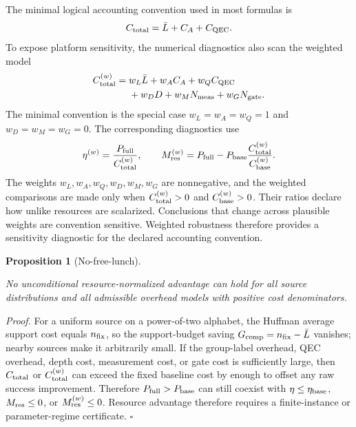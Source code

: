 \documentclass[
 reprint,
 amsmath,amssymb,
 aps,
 pra,
 floatfix,
]{revtex4-2}
\newtheorem{proposition}[theorem]{Proposition}
\begin{document}
The minimal logical accounting convention used in most formulas is
\begin{equation}
    C_{\rm total}=\bar L+C_A+C_{\rm QEC}.
\end{equation}
To expose platform sensitivity, the numerical diagnostics also scan the weighted model
\begin{equation}
    \begin{split}
    C_{\rm total}^{(w)}
    ={}& w_L\bar L+w_AC_A+w_QC_{\rm QEC}\\
    &+w_DD+w_MN_{\rm meas}+w_GN_{\rm gate}.
    \end{split}
    \label{eq:weighted_resource_model}
\end{equation}
The minimal convention is the special case \(w_L=w_A=w_Q=1\) and \(w_D=w_M=w_G=0\). The corresponding diagnostics use
\begin{equation}
    \eta^{(w)}=\frac{P_{\rm full}}{C_{\rm total}^{(w)}},
    \qquad
    M_{\rm res}^{(w)}
    =
    P_{\rm full}
    -
    P_{\rm base}\frac{C_{\rm total}^{(w)}}{C_{\rm base}^{(w)}}.
\end{equation}
The weights \(w_L,w_A,w_Q,w_D,w_M,w_G\) are nonnegative, and the weighted comparisons are made only when \(C_{\rm total}^{(w)}>0\) and \(C_{\rm base}^{(w)}>0\). Their ratios declare how unlike resources are scalarized. Conclusions that change across plausible weights are convention sensitive. Weighted robustness therefore provides a sensitivity diagnostic for the declared accounting convention.

\begin{proposition}[No-free-lunch]\label{prop:no-free-lunch}\hfill\par
No unconditional resource-normalized advantage can hold for all source distributions and all admissible overhead models with positive cost denominators.
\end{proposition}
\textit{Proof.} For a uniform source on a power-of-two alphabet, the Huffman average support cost equals \(n_{\rm fix}\), so the support-budget saving \(G_{\rm comp}=n_{\rm fix}-\bar L\) vanishes; nearby sources make it arbitrarily small. If the group-label overhead, QEC overhead, depth cost, measurement cost, or gate cost is sufficiently large, then \(C_{\rm total}\) or \(C_{\rm total}^{(w)}\) can exceed the fixed baseline cost by enough to offset any raw success improvement. Therefore \(P_{\rm full}>P_{\rm base}\) can still coexist with \(\eta\le\eta_{\rm base}\), \(M_{\rm res}\le0\), or \(M_{\rm res}^{(w)}\le0\). Resource advantage therefore requires a finite-instance or parameter-regime certificate. \(\square\)
\end{document}
